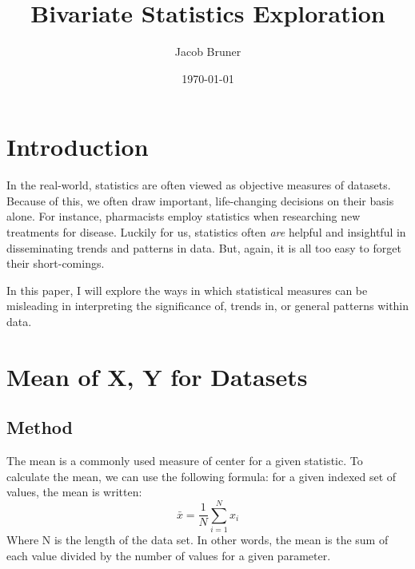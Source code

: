 \documentclass[11pt,a4paper]{article}
\author{Jacob Bruner}
\title{Bivariate Statistics Exploration}
\date{\today}
\begin{document}
\maketitle

\section{Introduction}

In the real-world, statistics are often viewed as objective measures of datasets. Because of this, we often draw important, life-changing decisions on their basis alone. For instance, pharmacists employ statistics when researching new treatments for disease. Luckily for us, statistics often \textit{are} helpful and insightful in disseminating trends and patterns in data. But, again, it is all too easy to forget their short-comings.

In this paper, I will explore the ways in which statistical measures can be misleading in interpreting the significance of, trends in, or general patterns within data.

\section{Mean of X, Y for Datasets}
\subsection{Method}
The mean is a commonly used measure of center for a given statistic. To calculate the mean, we can use the following formula: for a given indexed set of values, the mean is written:
\[
\bar{x} = \frac{1}{N} \sum_{i = 1}^{N} x_i
\]
Where N is the length of the data set. In other words, the mean is the sum of each value divided by the number of values for a given parameter. \\
\end{document}
